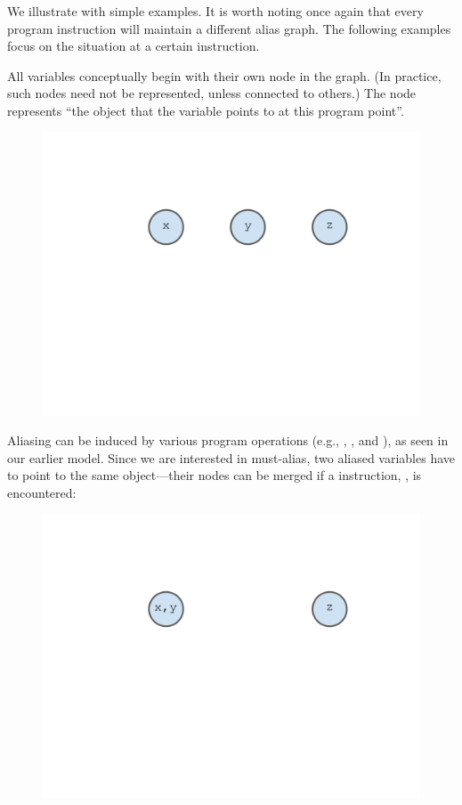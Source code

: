 We illustrate with simple examples. It is worth noting once again that every program instruction will maintain a different alias graph. The following examples focus on the situation at a certain instruction.

All variables conceptually begin with their own node in the graph. (In practice, such nodes need not be represented, unless connected to others.) The node represents ``the object that the variable points to at this program point''.

\begin{figure}[ht]
\centering
\includegraphics[trim={35mm 115mm 35mm 51mm},clip,width=0.8\linewidth]{assets/must-data/alias-graph0.pdf}
\end{figure}

Aliasing can be induced by various program operations (e.g., , , and ), as seen in our earlier model. Since we are interested in must-alias, two aliased variables have to point to the same object---their nodes can be merged if a  instruction, , is encountered:

\begin{figure}[ht]
\centering
\includegraphics[trim={35mm 115mm 35mm 51mm},clip,width=0.8\linewidth]{assets/must-data/alias-graph1.pdf}
\end{figure}

